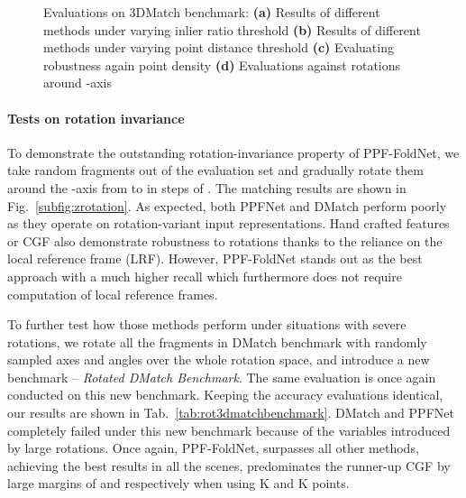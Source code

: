 \begin{figure*}[t!]
\centering
{}
\caption{Evaluations on 3DMatch benchmark: \textbf{(a)} Results of different methods under varying inlier ratio threshold \textbf{(b)} Results of different methods under varying point distance threshold \textbf{(c)} Evaluating robustness again point density
\textbf{(d)} Evaluations against rotations around -axis}
\label{fig:evaluations}
\end{figure*} 
\paragraph{Tests on rotation invariance}
To demonstrate the outstanding rotation-invariance property of PPF-FoldNet, we take random fragments out of the evaluation set and gradually rotate them around the -axis from  to  in steps of . The matching results are shown in Fig.~\ref{subfig:zrotation}. As expected, both PPFNet and DMatch perform poorly as they operate on rotation-variant input representations. Hand crafted features or CGF also demonstrate robustness to rotations thanks to the reliance on the local reference frame (LRF). However, PPF-FoldNet stands out as the best approach with a much higher recall which furthermore does not require computation of local reference frames.

To further test how those methods perform under situations with severe rotations, we rotate all the fragments in DMatch benchmark with randomly sampled axes and angles over the whole rotation space, and introduce a new benchmark -- \textit{Rotated DMatch Benchmark}. The same evaluation is once again conducted on this new benchmark. Keeping the accuracy evaluations identical, our results are shown in Tab.~\ref{tab:rot3dmatchbenchmark}. DMatch and PPFNet completely failed under this new benchmark because of the variables introduced by large rotations. Once again, PPF-FoldNet, surpasses all other methods, achieving the best results in all the scenes, predominates the runner-up CGF by large margins of  and  respectively when using K and K points.
